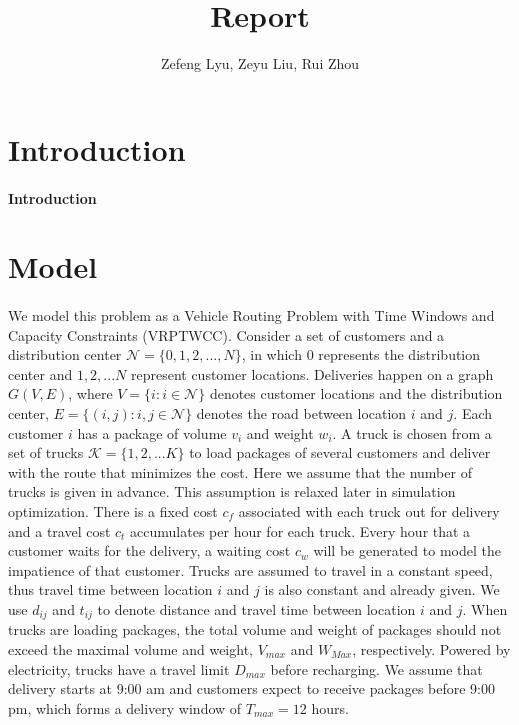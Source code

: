 \documentclass[12pt]{article}
\title{Report}
\author{Zefeng Lyu, Zeyu Liu, Rui Zhou}
\date{}
\numberwithin{equation}{section}
\begin{document}
\maketitle

\section{Introduction}

	\paragraph{Introduction}

\section{Model}
	
	\paragraph{}We model this problem as a Vehicle Routing Problem with Time Windows and Capacity Constraints (VRPTWCC)\parencite{Schneider2016}.  Consider a set of customers and a distribution center $\mathcal {N}=\{0,1,2,..., N\}$, in which 0 represents the distribution center and $1,2,...N$ represent customer locations. Deliveries happen on a graph $G(V, E)$, where $V=\{i: i\in \mathcal{N}\}$ denotes customer locations and the distribution center, $E=\{(i,j):i,j\in \mathcal{N}\}$ denotes the road between location $i$ and $j$.  Each customer $i$ has a package of volume $v_i$ and weight $w_i$. A truck is chosen from a set of trucks $\mathcal{K}=\{1,2,...K\}$ to load packages of several customers and deliver with the route that minimizes the cost. Here we assume that the number of trucks is given in advance. This assumption is relaxed later in simulation optimization. There is a fixed cost $c_f$ associated with each truck out for delivery and a travel cost $c_t$ accumulates per hour for each truck. Every hour that a customer waits for the delivery, a waiting cost $c_w$ will be generated to model the impatience of that customer. Trucks are assumed to travel in a constant speed, thus travel time between location $i$ and $j$ is also constant and already given. We use $d_{ij}$ and $t_{ij}$ to denote distance and travel time between location $i$ and $j$. When trucks are loading packages, the total volume and weight of packages should not exceed the maximal volume and weight, $V_{max}$ and $W_{Max}$, respectively. Powered by electricity, trucks have a travel limit $D_{max}$ before recharging. We assume that delivery starts at 9:00 am and customers expect to receive packages before 9:00 pm, which forms a delivery window of $T_{max}=12$ hours.
	
\end{document}
